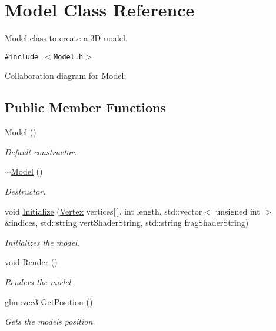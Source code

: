 \hypertarget{class_model}{
\section{Model Class Reference}
\label{class_model}
}
\hyperlink{class_model}{Model} class to create a 3D model.  


{\tt \#include $<$Model.h$>$}

Collaboration diagram for Model:\subsection*{Public Member Functions}
\begin{CompactItemize}
\item 
\hyperlink{class_model_e3b375de5f6df4faf74a95d64748e048}{Model} ()
\begin{CompactList}\small\item\em Default constructor. \item\end{CompactList}\item 
\hyperlink{class_model_d6ebd2062a0b823db841a0b88baac4c0}{$\sim$Model} ()
\begin{CompactList}\small\item\em Destructor. \item\end{CompactList}\item 
void \hyperlink{class_model_bb9bbb4050349e0c775dd383474aca37}{Initialize} (\hyperlink{struct_vertex}{Vertex} vertices\mbox{[}$\,$\mbox{]}, int length, std::vector$<$ unsigned int $>$ \&indices, std::string vertShaderString, std::string fragShaderString)
\begin{CompactList}\small\item\em Initializes the model. \item\end{CompactList}\item 
void \hyperlink{class_model_0a3de8a969bada5a82ffa727f8c216b5}{Render} ()
\begin{CompactList}\small\item\em Renders the model. \item\end{CompactList}\item 
\hyperlink{group__core__types_g1c47e8b3386109bc992b6c48e91b0be7}{glm::vec3} \hyperlink{class_model_5fe059a355fdb0531110696dafcec43b}{GetPosition} ()
\begin{CompactList}\small\item\em Gets the models position. \item\end{CompactList}\item 

\end{CompactItemize}
